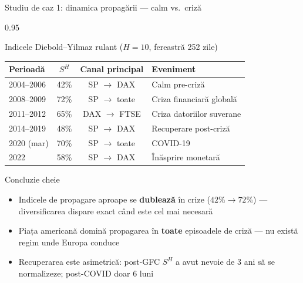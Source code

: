 \documentclass[9pt, aspectratio=169, t]{beamer}
\begin{document}
\begin{frame}{Studiu de caz 1: dinamica propagării --- calm vs.\ criză}
    \begin{cminipage}{0.95\textwidth}
    {\footnotesize
    \begin{block}{Indicele Diebold--Yilmaz rulant ($H=10$, fereastră 252 zile)}
        \vspace{0.1cm}
        {\small
        \begin{center}
        \begin{tabular}{l|c|c|l}
            \hline
            \textbf{Perioadă} & $S^H$ & \textbf{Canal principal} & \textbf{Eveniment} \\
            \hline
            2004--2006 & 42\% & SP $\rightarrow$ DAX & Calm pre-criză \\
            2008--2009 & 72\% & SP $\rightarrow$ toate & Criza financiară globală \\
            2011--2012 & 65\% & DAX $\rightarrow$ FTSE & Criza datoriilor suverane \\
            2014--2019 & 48\% & SP $\rightarrow$ DAX & Recuperare post-criză \\
            2020 (mar) & 70\% & SP $\rightarrow$ toate & COVID-19 \\
            2022 & 58\% & SP $\rightarrow$ DAX & Înăsprire monetară \\
            \hline
        \end{tabular}
        \end{center}
        }
    \end{block}
    \begin{alertblock}{Concluzie cheie}
        \begin{itemize}\setlength{\itemsep}{0pt}
            \item Indicele de propagare aproape se \textbf{dublează} în crize ($42\% \rightarrow 72\%$) --- diversificarea dispare exact când este cel mai necesară
            \item Piața americană domină propagarea în \textbf{toate} episoadele de criză --- nu există regim unde Europa conduce
            \item Recuperarea este asimetrică: post-GFC $S^H$ a avut nevoie de 3 ani să se normalizeze; post-COVID doar 6 luni
        \end{itemize}
    \end{alertblock}
    }
    \end{cminipage}
\end{frame}
\end{document}
